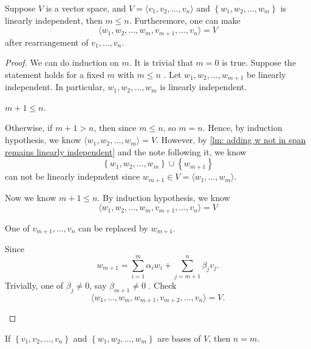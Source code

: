 \begin{theorem} \label{thm: sizeof(linearly ind.) less than sizeof(bases) and extend basis}
    Suppose \(V\) is a vector space, and \(V = \langle v_1, v_2, \dots , v_n \rangle \)  and \(\left\{ w_1, w_2, \dots , w_m \right\} \) is linearly independent, then \(m \le n\). Furtheremore, one can make 
    \[
        \langle w_1, w_2, \dots , w_m, v_{m+1}, \dots , v_n \rangle = V 
    \] after rearrangement of \(v_1, \dots , v_n\). 
\end{theorem}
\begin{proof}
    We can do induction on \(m\). It is trivial that \(m=0\) is true. Suppose the statement holds for a fixed \(m\) with \(m \le n\) . Let \(w_1, w_2, \dots , w_{m+1}\) be linearly independent.  In particular, \(w_1, w_2, \dots , w_m\) is linearly independent. 
    \begin{claim}
        \(m+1 \le n\). 
    \end{claim} 
    \begin{explanation}
        Otherwise, if \(m+1 > n\), then since \(m \le n\), so \(m = n\). Hence, by induction hypothesis, we know \(\langle w_1, w_2, \dots , w_m \rangle = V \). However, by \autoref{lm: adding w not in span remains linearly independent} and the note following it, we know 
        \[
            \left\{ w_1, w_2, \dots , w_m \right\} \cup \left\{ w_{m+1} \right\}  
        \] can not be linearly indepndent since \(w_{m+1} \in V = \langle w_1, \dots , w_m \rangle \).
    \end{explanation}

    Now we know \(m+1 \le n\). By induction hypothesis, we know 
    \[
        \langle w_1, w_2, \dots , w_m, v_{m+1}, \dots , v_n \rangle = V
    \] 
    \begin{claim}
        One of \(v_{m+1}, \dots , v_n\) can be replaced by \(w_{m+1}\).  
    \end{claim}
    \begin{explanation}
        Since 
        \[
            w_{m+1} = \sum_{i=1}^m \alpha _i w_i + \sum_{j=m+1}^n \beta _j v_j.  
        \]
        Trivially, one of \(\beta _j \neq 0\), say \(\beta _{m+1} \neq 0\) . Check 
        \[
            \langle w_1, \dots , w_m, w_{m+1}, v_{m+2}, \dots , v_n  \rangle = V.
        \] 
    \end{explanation}
\end{proof}

\begin{corollary} \label{cl: basis size unique}
    If \(\left\{ v_1, v_2, \dots , v_n \right\} \) and \(\left\{ w_1, w_2, \dots , w_m \right\} \) are bases of \(V\), then \(n = m\).    
\end{corollary}

